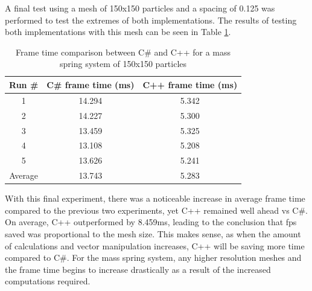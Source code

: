 \documentclass[12pt,a4paper]{article}
\begin{document}
A final test using a mesh of 150x150 particles and a spacing of 0.125 was performed to test the extremes of both implementations. The results of testing both implementations with this mesh can be seen in Table \ref{tab:lang3}.\\
\begin{table}[htbp]
	\centering
	\begin{tabular}{|c|c|c|} %
		\hline %
		Run \# & C\# frame time (ms) &  C++ frame time (ms) \\ %
		\hline %
		1 & 14.294 & 5.342 \\ 
		2 & 14.227 & 5.300 \\ 
		3 & 13.459 & 5.325 \\ 
		4 & 13.108 & 5.208  \\ 
		5 & 13.626 & 5.241  \\ 
		\hline
		Average & 13.743 & 5.283 \\ 
		\hline %
	\end{tabular}
	\caption{Frame time comparison between C\# and C++ for a mass spring system of 150x150 particles} %
	\label{tab:lang3}
\end{table}

With this final experiment, there was a noticeable increase in average frame time compared to the previous two experiments, yet C++ remained well ahead vs C\#. On average, C++ outperformed by 8.459ms, leading to the conclusion that fps saved was proportional to the mesh size. This makes sense, as when the amount of calculations and vector manipulation increases, C++ will be saving more time compared to C\#. For the mass spring system, any higher resolution meshes and the frame time begins to increase drastically as a result of the increased computations required.\\
\end{document}
